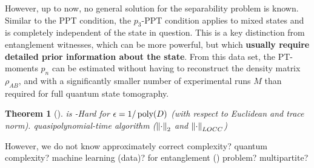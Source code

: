 \documentclass[
reprint,
aps,
pra,
floatfix,
]{revtex4-2}
\theoremstyle{plain}
\newtheorem{theorem}{Theorem}
\newtheorem{question}{Question}
\theoremstyle{definition}
\newcommand{\dm}{\rho}
\begin{document}
However, up to now, no general solution for the separability problem is known.
Similar to the PPT condition, the $p_3$-PPT condition applies to mixed states and is completely independent of the state in question. This is a key distinction from entanglement witnesses, which can be more powerful, but which \textbf{usually require detailed prior information about the state}.
From this data set, the PT-moments $p_n$ can be estimated without having to reconstruct the density matrix $\dm_{AB}$, and with a significantly smaller number of experimental runs $M$ than required for full quantum state tomography.
\begin{theorem}[\cite{gurvitsClassicalDeterministicComplexity2003}]
	 is -Hard for $\epsilon=1/\operatorname{\textup{poly}}(D)$ (with respect to Euclidean  and trace norm).
	\cite{ioannouComputationalComplexityQuantum2007}
	\cite{dohertyCompleteFamilySeparability2004}
	quasipolynomial-time algorithm ($\norm{\cdot}_2$ and $\norm{\cdot}_{LOCC}$) \cite{brandaoQuasipolynomialtimeAlgorithmQuantum2011}
\end{theorem}
	However, we do not know 
	approximately correct complexity? quantum complexity? machine learning (data)? for entanglement () problem? multipartite?
\end{document}
